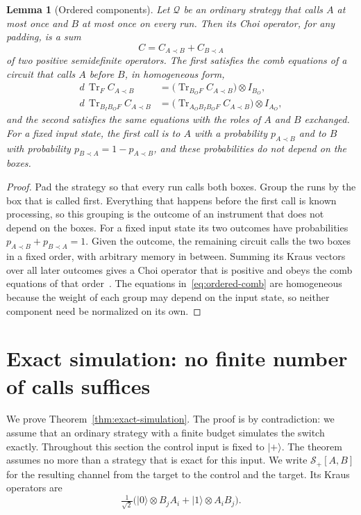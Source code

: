 \documentclass[11pt,letterpaper]{article}
\newtheorem{lemma}[theorem]{Lemma}
\theoremstyle{definition}\newtheorem{definition}[theorem]{Definition}
\newcommand{\Tr}{\operatorname{Tr}}
\newcommand{\ket}[1]{\lvert#1\rangle}
\newcommand{\SW}{\mathcal S}
\newcommand{\QC}{\mathcal Q}
\newcommand{\before}{\prec}
\begin{document}
\begin{lemma}[Ordered components]\label{lem:ordered}
Let $\QC$ be an ordinary strategy that calls $A$ at most once and $B$ at
most once on every run. Then its Choi operator, for any padding, is a sum
\[
 C=C_{A\before B}+C_{B\before A}
\]
of two positive semidefinite operators. The first satisfies the comb
equations of a circuit that calls $A$ before $B$, in homogeneous form,
\begin{equation}\label{eq:ordered-comb}
\begin{aligned}
 d\,\Tr_F C_{A\before B}&=\bigl(\Tr_{B_OF}C_{A\before B}\bigr)\otimes I_{B_O},\\
 d\,\Tr_{B_IB_OF} C_{A\before B}&=\bigl(\Tr_{A_OB_IB_OF}C_{A\before B}\bigr)\otimes I_{A_O},
\end{aligned}
\end{equation}
and the second satisfies the same equations with the roles of $A$ and
$B$ exchanged. For a fixed input state, the first call is to $A$ with a
probability $p_{A\before B}$ and to $B$ with probability
$p_{B\before A}=1-p_{A\before B}$, and these probabilities do not
depend on the boxes.
\end{lemma}



\begin{proof}
Pad the strategy so that every run calls both boxes. Group the runs by
the box that is called first. Everything that happens before the first
call is known processing, so this grouping is the outcome of an
instrument that does not depend on the boxes. For a fixed input state
its two outcomes have probabilities $p_{A\before B}+p_{B\before A}=1$.
Given the outcome, the remaining circuit calls the two boxes in a fixed
order, with arbitrary memory in between. Summing its Kraus vectors over
all later outcomes gives a Choi operator that is positive and obeys the
comb equations of that order~\cite{wechs2021}. The equations
in~\eqref{eq:ordered-comb} are homogeneous because the weight of each
group may depend on the input state, so neither component need be
normalized on its own.
\end{proof}

\section{Exact simulation: no finite number of calls suffices}\label{sec:exact}

We prove Theorem~\ref{thm:exact-simulation}. The proof is by
contradiction: we assume that an ordinary strategy with a finite budget
simulates the switch exactly. Throughout this section the
control input is fixed to $\ket+$. The theorem assumes no more than a
strategy that is exact for this input. We write $\SW_+[A,B]$ for
the resulting channel from the target to the control and the target. Its Kraus
operators are
\begin{equation}\label{eq:switch-plus}
 \tfrac1{\sqrt2}\bigl(\ket0\otimes B_jA_i+\ket1\otimes A_iB_j\bigr).
\end{equation}
\end{document}
